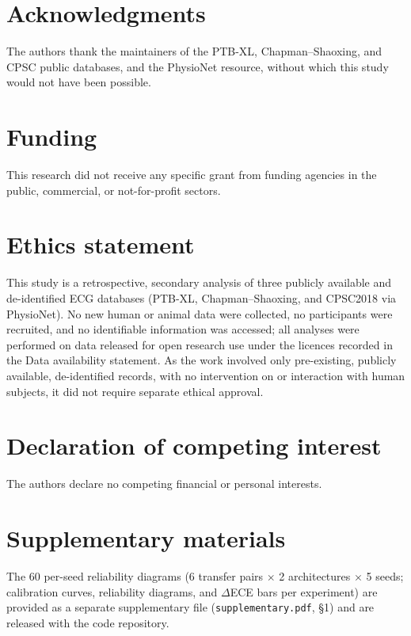 \documentclass[final,5p,times,nonatbib]{elsarticle}
\begin{document}
\section*{Acknowledgments}
The authors thank the maintainers of the PTB-XL, Chapman--Shaoxing,
and CPSC public databases, and the PhysioNet resource, without which
this study would not have been possible.

\section*{Funding}
This research did not receive any specific grant from funding
agencies in the public, commercial, or not-for-profit sectors.

\section*{Ethics statement}
This study is a retrospective, secondary analysis of three publicly
available and de-identified ECG databases (PTB-XL, Chapman--Shaoxing,
and CPSC2018 via PhysioNet). No new human or animal data were collected,
no participants were recruited, and no identifiable information was
accessed; all analyses were performed on data released for open research
use under the licences recorded in the Data availability statement. As
the work involved only pre-existing, publicly available, de-identified
records, with no intervention on or interaction with human subjects, it
did not require separate ethical approval.

\section*{Declaration of competing interest}
The authors declare no competing financial or personal interests.

\section*{Supplementary materials}
The 60 per-seed reliability diagrams
(6 transfer pairs $\times$ 2 architectures $\times$ 5 seeds; calibration
curves, reliability diagrams, and $\Delta$ECE bars per experiment) are
provided as a separate supplementary file
(\texttt{supplementary.pdf}, \S1) and are released with
the code repository.
\end{document}
